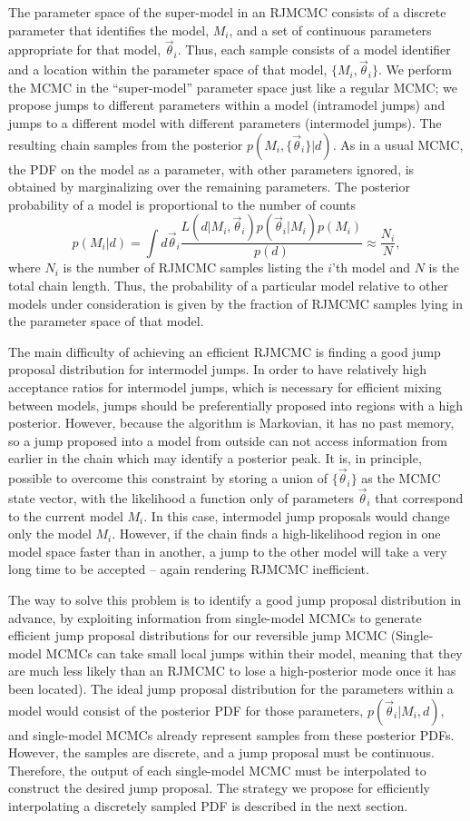 \documentclass{iopart}
\newcommand{\vtheta}{\vec{\theta}}
\newcommand{\be}{\begin{equation}}
\newcommand{\ee}{\end{equation}}
\begin{document}
The parameter space of the super-model in an RJMCMC consists of a
discrete parameter that identifies the model, $M_i$, and a set of
continuous parameters appropriate for that model, $\vtheta_i$.  Thus,
each sample consists of a model identifier and a location within the
parameter space of that model, $\{M_i, \vtheta_i\}$.  We perform the
MCMC in the ``super-model'' parameter space just like a regular MCMC;
we propose jumps to different parameters within a model (intramodel
jumps) and jumps to a different model with different parameters
(intermodel jumps).  The resulting chain samples from the posterior
$p(M_i, \{\vtheta_i\}|d)$.  As in a usual MCMC, the PDF on the model as a
parameter, with other parameters ignored, is obtained by marginalizing
over the remaining parameters.  The posterior probability of a model
is proportional to the number of counts
%
\be
%
p(M_i|d) = \int d\vtheta_i \frac{L(d|M_i, \vtheta_i) p(\vtheta_i|M_i) p(M_i)}{p(d)}
\approx \frac{N_i}{N},
%
\ee
%
where $N_i$ is the number of RJMCMC samples listing the $i$'th model
and $N$ is the total chain length.  Thus, the probability of a
particular model relative to other models under consideration is given
by the fraction of RJMCMC samples lying in the parameter space of that
model.
 
The main difficulty of achieving an efficient RJMCMC is finding a good
jump proposal distribution for intermodel jumps.  In order to have
relatively high acceptance ratios for intermodel jumps, which is
necessary for efficient mixing between models, jumps should be
preferentially proposed into regions with a high posterior.  However,
because the algorithm is Markovian, it has no past memory, so a jump
proposed into a model from outside can not access information from
earlier in the chain which may identify a posterior peak.  It is, in principle, possible to overcome this constraint by storing a union of $\{\vtheta_i\}$ as the MCMC state vector, with the likelihood a function only of parameters $\vtheta_i$ that correspond to the current model $M_i$.  In this case, intermodel jump proposals would change only the model $M_i$.  However, if the chain finds a high-likelihood region in one model space faster than in another, a jump to the other model will take a very long time to be accepted -- again rendering RJMCMC inefficient.

The way to solve this problem is to identify a good jump proposal
distribution in advance, by exploiting information from single-model
MCMCs to generate efficient jump proposal distributions for our
reversible jump MCMC (Single-model MCMCs can take small local jumps
within their model, meaning that they are much less likely than an
RJMCMC to lose a high-posterior mode once it has been located).  The
ideal jump proposal distribution for the parameters within a model
would consist of the posterior PDF for those parameters,
$p(\vtheta_i|M_i,d)$, and single-model MCMCs already represent samples
from these posterior PDFs.  However, the samples are discrete, and a
jump proposal must be continuous.  Therefore, the output of each
single-model MCMC must be interpolated to construct the desired jump
proposal.  The strategy we propose for efficiently interpolating
a discretely sampled PDF is described in the next section.
\end{document}
